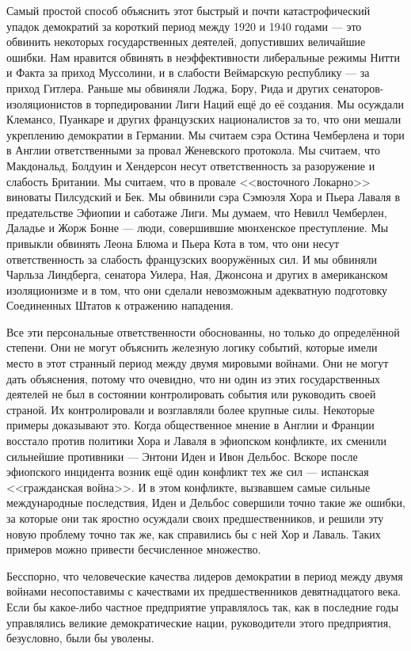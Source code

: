 Самый простой способ объяснить этот быстрый и почти катастрофический упадок демократий за короткий период между 1920 и 1940 годами — это обвинить некоторых государственных деятелей, допустивших величайшие ошибки. Нам нравится обвинять в неэффективности либеральные режимы Нитти и Факта за приход Муссолини, и в слабости Веймарскую республику — за приход Гитлера. Раньше мы обвиняли Лоджа, Бору, Рида и других сенаторов-изоляционистов в торпедировании Лиги Наций ещё до её создания. Мы осуждали Клемансо, Пуанкаре и других французских националистов за то, что они мешали укреплению демократии в Германии. Мы считаем сэра Остина Чемберлена и тори в Англии ответственными за провал Женевского протокола. Мы считаем, что Макдональд, Болдуин и Хендерсон несут ответственность за разоружение и слабость Британии. Мы считаем, что в провале <<восточного Локарно>> виноваты Пилсудский и Бек. Мы обвинили сэра Сэмюэля Хора и Пьера Лаваля в предательстве Эфиопии и саботаже Лиги. Мы думаем, что Невилл Чемберлен, Даладье и Жорж Бонне — люди, совершившие мюнхенское преступление. Мы привыкли обвинять Леона Блюма и Пьера Кота в том, что они несут ответственность за слабость французских вооружённых сил. И мы обвиняли Чарльза Линдберга, сенатора Уилера, Ная, Джонсона и других в американском изоляционизме и в том, что они сделали невозможным адекватную подготовку Соединенных Штатов к отражению нападения.

Все эти персональные ответственности обоснованны, но только до определённой степени. Они не могут объяснить железную логику событий, которые имели место в этот странный период между двумя мировыми войнами. Они не могут дать объяснения, потому что очевидно, что ни один из этих государственных деятелей не был в состоянии контролировать события или руководить своей страной. Их контролировали и возглавляли более крупные силы. Некоторые примеры доказывают это. Когда общественное мнение в Англии и Франции восстало против политики Хора и Лаваля в эфиопском конфликте, их сменили сильнейшие противники — Энтони Иден и Ивон Дельбос. Вскоре после эфиопского инцидента возник ещё один конфликт тех же сил — испанская <<гражданская война>>. И в этом конфликте, вызвавшем самые сильные международные последствия, Иден и Дельбос совершили точно такие же ошибки, за которые они так яростно осуждали своих предшественников, и решили эту новую проблему точно так же, как справились бы с ней Хор и Лаваль. Таких примеров можно привести бесчисленное множество.

Бесспорно, что человеческие качества лидеров демократии в период между двумя войнами несопоставимы с качествами их предшественников девятнадцатого века. Если бы какое-либо частное предприятие управлялось так, как в последние годы управлялись великие демократические нации, руководители этого предприятия, безусловно, были бы уволены.

